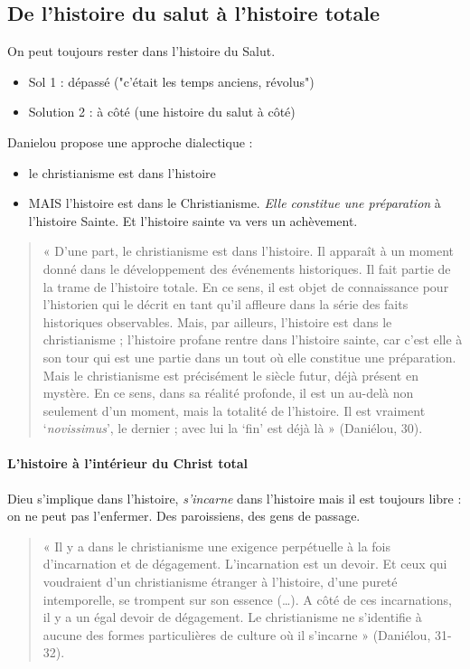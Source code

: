 \subsection{De l’histoire du salut à l’histoire totale}
On peut toujours rester dans l'histoire du Salut.
\begin{itemize}
    \item Sol 1 : dépassé ("c'était les temps anciens, révolus")
    \item Solution 2 : à côté (une histoire du salut à côté)
\end{itemize}
Danielou propose une approche dialectique : 
\begin{itemize}
    \item le christianisme est dans l'histoire
    \item MAIS l'histoire est dans le Christianisme. \textit{Elle constitue une préparation} à l'histoire Sainte. Et l'histoire sainte va vers un achèvement. 
\end{itemize}


\begin{quote}
    « D’une part, le christianisme est dans l’histoire. Il apparaît à un moment donné dans le développement des événements historiques. Il fait partie de la trame de l’histoire totale. En ce sens, il est objet de connaissance pour l’historien qui le décrit en tant qu’il affleure dans la série des faits historiques observables. Mais, par ailleurs, l’histoire est dans le christianisme ; l’histoire profane rentre dans l’histoire sainte, car c’est elle à son tour qui est une partie dans un tout où elle constitue une préparation. Mais le christianisme est précisément le siècle futur, déjà présent en mystère. En ce sens, dans sa réalité profonde, il est un au-delà non seulement d’un moment, mais la totalité de l’histoire. Il est vraiment ‘\textit{novissimus}’, le dernier ; avec lui la ‘fin’ est déjà là » (Daniélou, 30). 
\end{quote}



\paragraph{L’histoire à l’intérieur du Christ total} Dieu s'implique dans l'histoire, \textit{s'incarne} dans l'histoire mais il est toujours libre : on ne peut pas l'enfermer. Des paroissiens, des gens de passage.

\begin{quote}
    « Il y a dans le christianisme une exigence perpétuelle à la fois d’incarnation et de dégagement. L’incarnation est un devoir. Et ceux qui voudraient d’un christianisme étranger à l’histoire, d’une pureté intemporelle, se trompent sur son essence (…). A côté de ces incarnations, il y a un égal devoir de dégagement. Le christianisme ne s’identifie à aucune des formes particulières de culture où il s’incarne » (Daniélou, 31-32). 
\end{quote}

